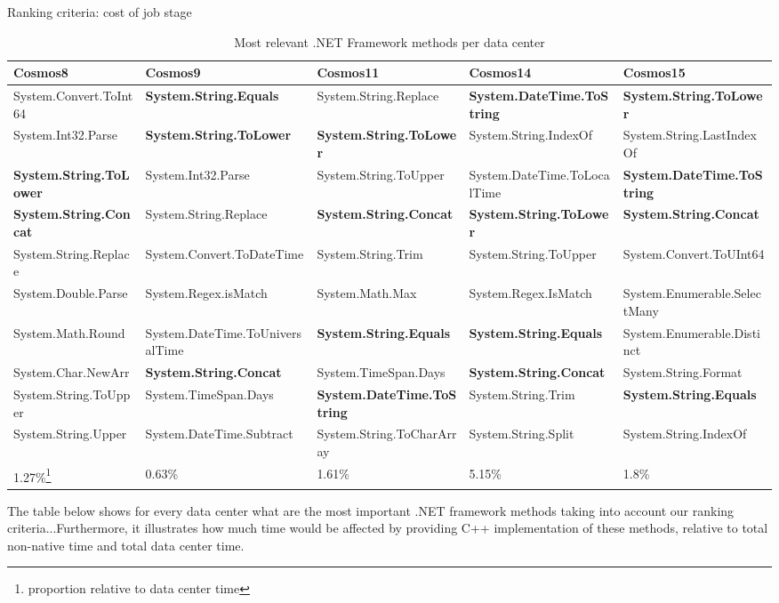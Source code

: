 Ranking criteria: cost of job stage
\begin{table}[ht]
\small
 \begin{tabular}{@{}llllp{3.5cm}@{}}

  Cosmos8 & Cosmos9 & Cosmos11 & Cosmos14 & Cosmos15 \\
 \midrule
System.Convert.ToInt64 & \textbf{System.String.Equals} & System.String.Replace & \textbf{System.DateTime.ToString} & \textbf{System.String.ToLower} \\
System.Int32.Parse & \textbf{System.String.ToLower} & \textbf{System.String.ToLower} & System.String.IndexOf & System.String.LastIndexOf \\
\textbf{System.String.ToLower} & System.Int32.Parse & System.String.ToUpper & System.DateTime.ToLocalTime & \textbf{System.DateTime.ToString}\\
\textbf{System.String.Concat} & System.String.Replace & \textbf{System.String.Concat} & \textbf{System.String.ToLower} & \textbf{System.String.Concat}\\
System.String.Replace & System.Convert.ToDateTime & System.String.Trim & System.String.ToUpper & System.Convert.ToUInt64 \\
System.Double.Parse & System.Regex.isMatch & System.Math.Max & System.Regex.IsMatch & System.Enumerable.SelectMany \\
System.Math.Round& System.DateTime.ToUniversalTime & \textbf{System.String.Equals} & \textbf{System.String.Equals} & System.Enumerable.Distinct \\
System.Char.NewArr & \textbf{System.String.Concat} & System.TimeSpan.Days & \textbf{System.String.Concat} & System.String.Format \\
System.String.ToUpper & System.TimeSpan.Days & \textbf{System.DateTime.ToString} & System.String.Trim & \textbf{System.String.Equals}\\
System.String.Upper & System.DateTime.Subtract & System.String.ToCharArray & System.String.Split & System.String.IndexOf \\

\midrule
1.27\%\footnote{proportion relative to data center time} & 0.63\% & 1.61\% & 5.15\% & 1.8\%\\
\midrule

\end{tabular}
 \label{tb:projects}
\caption{Most relevant .NET Framework methods per data center}
\end{table}

The table below shows for every data center what are the most important .NET framework methods taking into account our ranking criteria...Furthermore, it illustrates how much time would be affected by providing C++ implementation of these methods, relative to total non-native time and total data center time.

